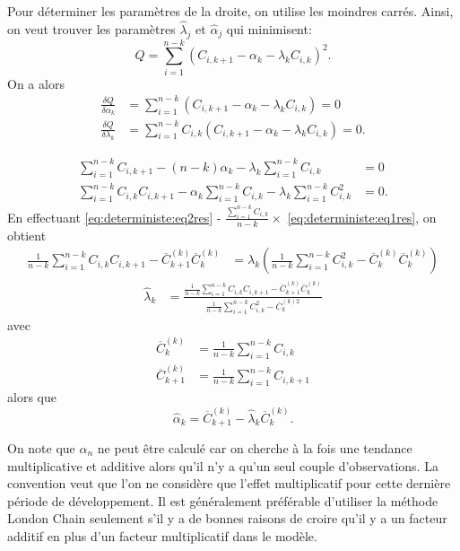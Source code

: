 Pour déterminer les paramètres de la droite, on utilise les moindres
carrés. Ainsi, on veut trouver les paramètres $\hat{\lambda}_j$ et
$\hat{\alpha}_j$ qui minimisent:
\begin{equation*}
  Q = \sum_{i=1}^{n-k} (C_{i,k+1} - \alpha_k - \lambda_k C_{i,k} )^2.
\end{equation*}
On a alors
\begin{align*}
  \frac{\delta Q}{\delta \alpha_k} &= \sum_{i=1}^{n-k} (C_{i,k+1} - \alpha_k - \lambda_k C_{i,k} ) = 0 \\
  \frac{\delta Q}{\delta \lambda_k} &= \sum_{i=1}^{n-k} C_{i,k} (C_{i,k+1} - \alpha_k - \lambda_k C_{i,k} ) = 0.
\end{align*}

\begin{align}
  \sum_{i=1}^{n-k} C_{i,k+1} - (n-k) \alpha_k - \lambda_k
  \sum_{i=1}^{n-k}  C_{i,k}
  &= 0 \label{eq:deterministe:eq1res} \\
  \sum_{i=1}^{n-k} C_{i,k} C_{i,k+1} -  \alpha_k \sum_{i=1}^{n-k}
  C_{i,k} - \lambda_k \sum_{i=1}^{n-k}  C_{i,k}^2
  &= 0. \label{eq:deterministe:eq2res}
\end{align}
En effectuant \eqref{eq:deterministe:eq2res} -
$\frac{\sum_{i=1}^{n-k} C_{i,k}}{n-k} \times$
\eqref{eq:deterministe:eq1res}, on obtient
\begin{align*}
  \frac{1}{n-k} \sum_{i=1}^{n-k} C_{i,k} C_{i,k+1} - \overline{C}_{k+1}^{(k)} \overline{C}_{k}^{(k)}
  &= \lambda_k \left(\frac{1}{n-k} \sum_{i=1}^{n-k}  C_{i,k}^2 - \overline{C}_{k}^{(k)} \overline{C}_{k}^{(k)} \right)
\end{align*}
\begin{align*}
  \hat{\lambda}_k &= \frac{\frac{1}{n-k} \sum_{i=1}^{n-k} C_{i,k} C_{i,k+1} - \overline{C}_{k+1}^{(k)} \overline{C}_{k}^{(k)} }
                    {\frac{1}{n-k} \sum_{i=1}^{n-k}  C_{i,k}^2 - \overline{C}_{k}^{(k)2} }
\end{align*}
avec
\begin{align*}
  \overline{C}_{k}^{(k)} &= \frac{1}{n-k}  \sum_{i=1}^{n-k} C_{i,k} \\
  \overline{C}_{k+1}^{(k)} &= \frac{1}{n-k} \sum_{i=1}^{n-k} C_{i,k+1}
\end{align*}
alors que
\begin{equation*}
  \hat{\alpha}_k = \overline{C}_{k+1}^{(k)} - \hat{\lambda}_k \overline{C}_{k}^{(k)}.
\end{equation*}

On note que $\alpha_{n}$ ne peut être calculé car on cherche à la fois
une tendance multiplicative et additive alors qu'il n'y a qu'un seul
couple d'observations. La convention veut que l'on ne considère que
l'effet multiplicatif pour cette dernière période de développement. Il
est généralement préférable d'utiliser la méthode London Chain
seulement s'il y a de bonnes raisons de croire qu'il y a un facteur
additif en plus d'un facteur multiplicatif dans le modèle.

